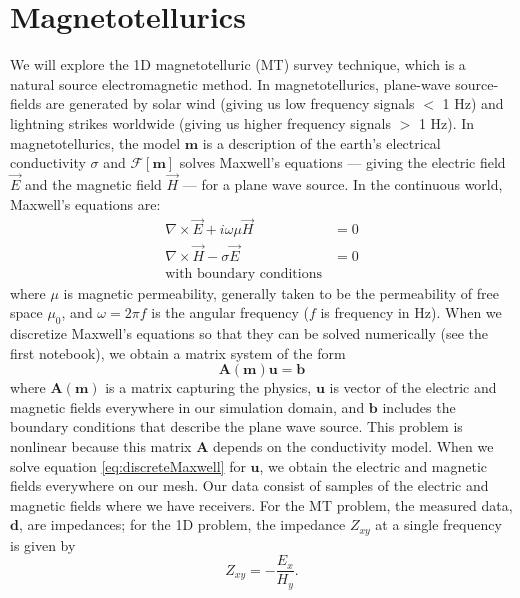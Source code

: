 \documentclass[11pt,oneside]{article}
\begin{document}
\section{Magnetotellurics}
We will explore the 1D magnetotelluric (MT) survey technique, which is a natural source electromagnetic method. In magnetotellurics, plane-wave source-fields are generated by solar wind (giving us low frequency signals $<$ 1 Hz) and lightning strikes worldwide (giving us higher frequency signals $>$ 1 Hz). In magnetotellurics, the model $\mathbf{m}$ is a description of the earth’s electrical conductivity $\sigma$ and $\mathcal{F}[\mathbf{m}]$ solves Maxwell’s equations --- giving the electric field $\vec{E}$ and the magnetic field $\vec{H}$ --- for a plane wave source. In the continuous world, Maxwell’s equations are:
\begin{equation}
\begin{split}
\nabla \times \vec{E} + i\omega\mu\vec{H} &= 0 \\
\nabla \times \vec{H} - \sigma\vec{E} &= 0 \\
\text{with boundary conditions}
\end{split}
\label{eq:maxwell}
\end{equation}
where $\mu$ is magnetic permeability, generally taken to be the permeability of free space $\mu_0$, and $\omega = 2 \pi f$ is the angular frequency ($f$ is frequency in Hz). When we discretize Maxwell's equations so that they can be solved numerically (see the first notebook), we obtain a matrix system of the form
\begin{equation}
    \mathbf{A}(\mathbf{m})\mathbf{u} = \mathbf{b}
    \label{eq:discreteMaxwell}
\end{equation}
where $\mathbf{A}(\mathbf{m})$ is a matrix capturing the physics, $\mathbf{u}$ is vector of the electric and magnetic fields everywhere in our simulation domain, and $\mathbf{b}$ includes the boundary conditions that describe the plane wave source. This problem is nonlinear because this matrix $\mathbf{A}$ depends on the conductivity model. When we solve equation \ref{eq:discreteMaxwell} for $\mathbf{u}$, we obtain the electric and magnetic fields everywhere on our mesh. Our data consist of samples of the electric and magnetic fields where we have receivers. For the MT problem, the measured data, $\mathbf{d}$, are impedances; for the 1D problem, the impedance $Z_{xy}$ at a single frequency is given by
\begin{equation}
Z_{xy} = -\frac{E_x}{H_y}.
\label{eq:impedance}
\end{equation}
\end{document}
